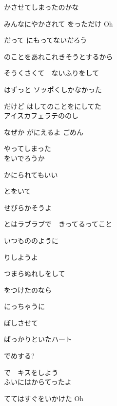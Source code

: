 かさせてしまったのかな

みんなにやかされて をっただけ Oh

だって にもってないだろう

のことをあれこれきそうとするから

そうくさくて　ないふりをして

はずっと ソッポくしかなかった

だけど はしてのことをにしてた
\\

アイスカフェラテののし

なぜか がにえるよ ごめん

やってしまった
\\

をいでろうか

かにられてもいい

とをいて

せびらかそうよ

とはラブラブで　きってるってこと

いつもののように

りしようよ

つまらぬれしをして

をつけたのなら

にっちゃうに

ぼしさせて

ばっかりといたハート

でめする?

で　キスをしよう
\\

ふいにはからてったよ

ててはすぐをいかけた Oh


